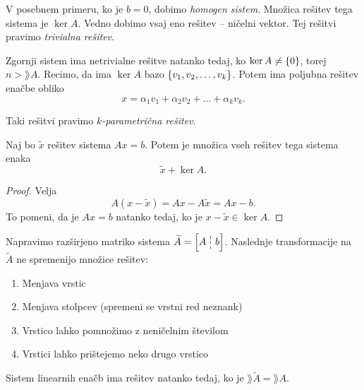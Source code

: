 \documentclass[12pt, a4paper]{article}
\begin{document}
V posebnem primeru, ko je $b=0$, dobimo \emph{homogen sistem}. Množica rešitev tega sistema je $\ker A$. Vedno dobimo vsaj eno rešitev -- ničelni vektor. Tej rešitvi pravimo \emph{trivialna rešitev}.

Zgornji sistem ima netrivialne rešitve natanko tedaj, ko $\ker A\ne\left\{0\right\}$, torej $n>\rang A$. Recimo, da ima $\ker A$ bazo $\left\{v_1,v_2,\dots,v_k\right\}$. Potem ima poljubna rešitev enačbe obliko
\[
x=\alpha_1v_1+\alpha_2v_2+\dots+\alpha_kv_k.
\]

Taki rešitvi pravimo \emph{$k$-parametrična rešitev}.

\begin{izrek}
Naj bo $\widetilde{x}$ rešitev sistema $Ax=b$. Potem je množica vseh rešitev tega sistema enaka
\[
\widetilde{x}+\ker A.
\]
\end{izrek}

\begin{proof}
Velja
\[
A(x-\widetilde{x})=Ax-A\widetilde{x}=Ax-b.
\]
To pomeni, da je $Ax=b$ natanko tedaj, ko je $x-\widetilde{x}\in\ker A$.
\end{proof}

Napravimo razširjeno matriko sistema $\widetilde{A}=\left[A\dashline b\right]$. Naslednje transformacije na $\widetilde{A}$ ne spremenijo množice rešitev:

\begin{enumerate}
\item Menjava vrstic
\item Menjava stolpcev (spremeni se vrstni red neznank)
\item Vrstico lahko pomnožimo z neničelnim številom
\item Vrstici lahko prištejemo neko drugo vrstico
\end{enumerate}

\begin{izrek}
Sistem linearnih enačb ima rešitev natanko tedaj, ko je $\rang\widetilde{A}=\rang A$.
\end{izrek}
\end{document}
